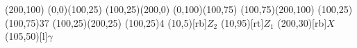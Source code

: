 \begin{axopicture}(200,100)
	\Line[arrow](0,0)(100,25)
	\Line[arrow](100,25)(200,0)
	\Line[arrow](0,100)(100,75) \Line[arrow](100,75)(200,100)
	\Photon(100,25)(100,75){3}{7}
	(100,25)(200,25)
	\Vertex(100,25){4}
	\Text(10,5)[rb]{$Z_2$}
	\Text(10,95)[rt]{$Z_1$}
	\Text(200,30)[rb]{$X$}
	\Text(105,50)[l]{$\gamma$}
\end{axopicture}


